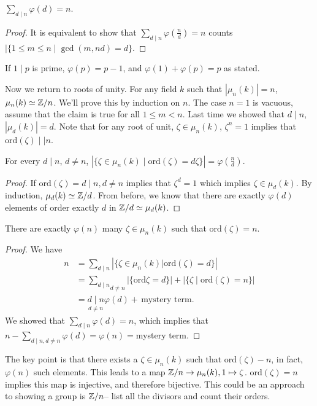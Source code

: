 \begin{cor}
    $\sum _{d \mid  n}\varphi (d)=n$.
\end{cor}
\begin{proof}
    It is equivalent to show that $\sum _{d \mid n }\varphi  \left( \frac{n}{d} \right) =n$ counts $| \{1 \leq m \leq n \mid  \gcd (m,nd)=d\} $.
\end{proof}
\begin{example}
        If $1 \mid  p$ is prime, $\varphi (p)=p-1$, and $\varphi (1)+\varphi (p)=p$ as stated.
\end{example}
Now we return to roots of unity. For any field $k$ such that $| \mu _n (k)| =n$, $\mu _n (k) \simeq  \mathbb{Z} /n$. 
We'll prove this by induction on $n$. The case $n=1$ is vacuous, assume that the claim is true for all $1 \leq m < n$. Last time we showed that $d \mid  n$, $|\mu _d(k)|=d$. Note that for any root of unit, $\zeta \in  \mu _n (k)$, $\zeta ^n  =1$ implies that $\mathrm{ord}(\zeta) \mid |n$.

\begin{claim}
    For every $d \mid  n$, $d\neq n$, $| \{\zeta \in \mu _n (k) \mid  \mathrm{ord}(\zeta)=d\zeta\} |=\varphi \left( \frac{n}{d} \right) $.
\end{claim}
\begin{proof}
    If $\mathrm{ord}(\zeta)=d \mid n, d\neq n$ implies that $\zeta ^d=1$ which implies $\zeta \in \mu_d(k)$. By induction, $\mu_d(k) \simeq  \mathbb{Z} /d$. From before, we know that there are exactly $\varphi (d)$ elements of order exactly $d$ in $\mathbb{Z} /d \simeq  \mu_d(k)$.
\end{proof}
\begin{cor}
    There are exactly $\varphi (n)$ many $\zeta \in \mu _n (k)$ such that $\mathrm{ord}(\zeta)=n$.
\end{cor}
\begin{proof}
    We have
     \begin{align*}
         n&=\sum _{d \mid n}\left| \{\zeta \in \mu _n  (k) | \mathrm{ord}(\zeta)=d\}  \right| \\
          &= \underset{d\neq n}{\sum _{d \mid n}} | \{ \mathrm{ord}\zeta =d\} | + \left| \{ \zeta \mid  \mathrm{ord}(\zeta)=n\}  \right| \\
          &= \underset{d \neq n}{d \mid n} \varphi (d)+ \, \text{mystery term}.
     \end{align*}
     We showed that $\sum _{d \mid n}\varphi (d)=n$, which implies that $n- \sum _{d\mid n, d\neq n}\varphi (d)=\varphi (n)=$mystery term.
\end{proof}
The key point is that there exists a $\zeta \in \mu_n (k)$ such that $\mathrm{ord}(\zeta)-n$, in fact, $\varphi (n)$ such elements. This leads to a map $\mathbb{Z} / n \to \mu_n (k), 1 \mapsto \zeta$. $\mathrm{ord}(\zeta)=n$ implies this map is injective, and therefore bijective. This could be an approach to showing a group is $\mathbb{Z} /n$-- list all the divisors and count their orders.

